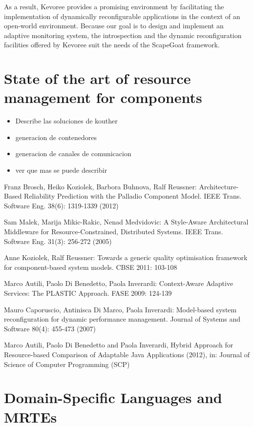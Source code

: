 As a result, Kevoree provides a promising environment by facilitating the implementation of dynamically reconfigurable applications in the context of an open-world environment.
Because our goal is to design and implement an adaptive monitoring system, the introspection and the dynamic reconfiguration facilities offered by Kevoree suit the needs of the ScapeGoat framework.


\section{State of the art of resource management for components} \label{sec:component-leverage}
\begin{itemize}
\item Describe las soluciones de kouther
\item generacion de contenedores
\item generacion de canales de comunicacion
\item ver que mas se puede describir
\end{itemize}


Franz Brosch, Heiko Koziolek, Barbora Buhnova, Ralf Reussner: Architecture-Based Reliability Prediction with the Palladio Component Model. IEEE Trans. Software Eng. 38(6): 1319-1339 (2012)

Sam Malek, Marija Mikic-Rakic, Nenad Medvidovic: A Style-Aware Architectural Middleware for Resource-Constrained, Distributed Systems. IEEE Trans. Software Eng. 31(3): 256-272 (2005)

Anne Koziolek, Ralf Reussner: Towards a generic quality optimisation framework for component-based system models. CBSE 2011: 103-108

Marco Autili, Paolo Di Benedetto, Paola Inverardi: Context-Aware Adaptive Services: The PLASTIC Approach. FASE 2009: 124-139

Mauro Caporuscio, Antinisca Di Marco, Paola Inverardi: Model-based system reconfiguration for dynamic performance management. Journal of Systems and Software 80(4): 455-473 (2007)

Marco Autili, Paolo Di Benedetto and Paola Inverardi, Hybrid Approach for Resource-based Comparison of Adaptable Java Applications (2012), in: Journal of Science of Computer Programming (SCP)

\section{Domain-Specific Languages and MRTEs} \label{sec:DSL-on-MRTEs}

